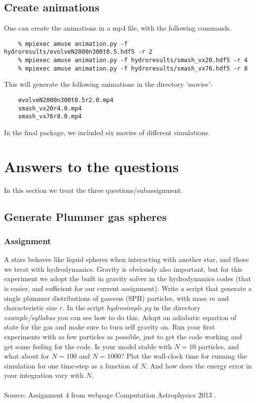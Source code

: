 \documentclass[a4paper]{article}
\begin{document}
\subsection{Create animations}
One can create the animations in a mp4 file, with the following commands.
    \begin{verbatim}
    % mpiexec amuse animation.py -f hydroresults/evolveN2000n300t0.5.hdf5 -r 2
    % mpiexec amuse animation.py -f hydroresults/smash_vx20.hdf5 -r 4
    % mpiexec amuse animation.py -f hydroresults/smash_vx76.hdf5 -r 8
    \end{verbatim}
This will generate the following animations in the directory 'movies':
    \begin{verbatim}
    evolveN2000n300t0.5r2.0.mp4
    smash_vx20r4.0.mp4
    smash_vx76r8.0.mp4
    \end{verbatim}
In the final package, we included six movies of different simulations.
\newpage
\section{Answers to the questions}
\label{sec:answers}
In this section we treat the three questions/subassignment.
\subsection{Generate Plummer gas spheres}
\subsubsection{Assignment}
A stars behaves like liquid spheres when interacting with another star, and those we treat with hydrodynamics. Gravity is obviously also important, but for this experiment we adopt the built in gravity solver in the hydrodynamics codes (that is easier, and sufficient for our current assignment). Write a script that generate a single plummer distributions of gaseous (SPH) particles, with mass $m$ and characteristic size $r$. In the script \emph{hydrosimple.py} in the directory \emph{example/syllabus} you can see how to do this. Adopt an adiabatic equation of state for the gas and make sure to turn self gravity on. Run your first experiments with as few particles as possible, just to get the code working and get some feeling for the code. Is your model stable with $N= 10$ particles, and what about for $N = 100$ and $N = 1000$? Plot the wall-clock time for running the simulation for one time-step as a function of $N$. And how does the energy error in your integration vary with $N$.\\
\\
Source: Assignment 4 from webpage Computation Astrophysics 2013 \cite{ass4}.
\end{document}
